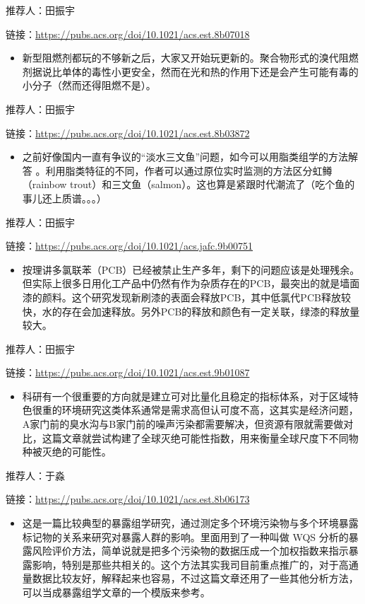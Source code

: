 \documentclass[
]{book}
\providecommand{\tightlist}{%
  \setlength{\itemsep}{0pt}\setlength{\parskip}{0pt}}
\begin{document}
推荐人：田振宇

链接：\url{https://pubs.acs.org/doi/10.1021/acs.est.8b07018}

\begin{itemize}
\tightlist
\item
  新型阻燃剂都玩的不够新之后，大家又开始玩更新的。聚合物形式的溴代阻燃剂据说比单体的毒性小更安全，然而在光和热的作用下还是会产生可能有毒的小分子（然而还得阻燃不是）。
\end{itemize}

推荐人：田振宇

链接：\url{https://pubs.acs.org/doi/10.1021/acs.est.8b03872}

\begin{itemize}
\tightlist
\item
  之前好像国内一直有争议的``淡水三文鱼''问题，如今可以用脂类组学的方法解答 。利用脂类特征的不同，作者可以通过原位实时监测的方法区分虹鳟（rainbow trout）和三文鱼（salmon）。这也算是紧跟时代潮流了（吃个鱼的事儿还上质谱。。。）
\end{itemize}

推荐人：田振宇

链接：\url{https://pubs.acs.org/doi/10.1021/acs.jafc.9b00751}

\begin{itemize}
\tightlist
\item
  按理讲多氯联苯（PCB）已经被禁止生产多年，剩下的问题应该是处理残余。但实际上很多日用化工产品中仍然有作为杂质存在的PCB，最突出的就是墙面漆的颜料。这个研究发现新刷漆的表面会释放PCB，其中低氯代PCB释放较快，水的存在会加速释放。另外PCB的释放和颜色有一定关联，绿漆的释放量较大。
\end{itemize}

推荐人：田振宇

链接：\url{https://pubs.acs.org/doi/10.1021/acs.est.9b01087}

\begin{itemize}
\tightlist
\item
  科研有一个很重要的方向就是建立可对比量化且稳定的指标体系，对于区域特色很重的环境研究这类体系通常是需求高但认可度不高，这其实是经济问题，A家门前的臭水沟与B家门前的噪声污染都需要解决，但资源有限就需要做对比，这篇文章就尝试构建了全球灭绝可能性指数，用来衡量全球尺度下不同物种被灭绝的可能性。
\end{itemize}

推荐人：于淼

链接：\url{https://pubs.acs.org/doi/10.1021/acs.est.8b06173}

\begin{itemize}
\tightlist
\item
  这是一篇比较典型的暴露组学研究，通过测定多个环境污染物与多个环境暴露标记物的关系来研究对暴露人群的影响。里面用到了一种叫做 WQS 分析的暴露风险评价方法，简单说就是把多个污染物的数据压成一个加权指数来指示暴露影响，特别是那些共相关的。这个方法其实我司目前重点推广的，对于高通量数据比较友好，解释起来也容易，不过这篇文章还用了一些其他分析方法，可以当成暴露组学文章的一个模版来参考。
\end{itemize}
\end{document}
